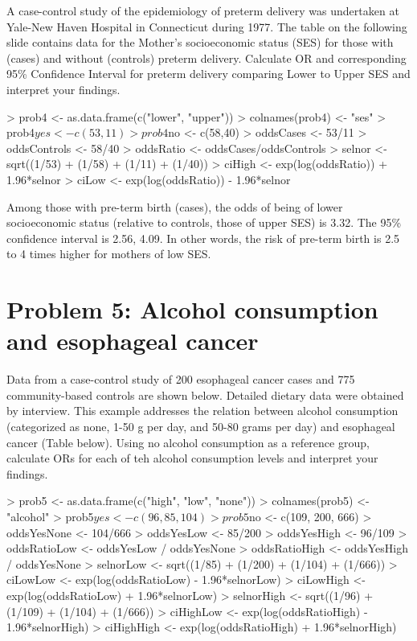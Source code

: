 \documentclass[12pt]{article}
\begin{document}
\textcolor{black!50}{A case-control study of the epidemiology of preterm delivery was undertaken at Yale-New Haven Hospital in Connecticut during 1977.  The table on the following slide contains data for the Mother's socioeconomic status (SES) for those with (cases) and without (controls) preterm delivery.  Calculate OR and corresponding 95\% Confidence Interval for preterm delivery comparing Lower to Upper SES and interpret your findings.  \\}
\begin{Schunk}
\begin{Sinput}
> prob4 <- as.data.frame(c("lower", "upper"))
> colnames(prob4) <- "ses"
> prob4$yes <- c(53,11)
> prob4$no <- c(58,40)
> oddsCases <- 53/11
> oddsControls <- 58/40
> oddsRatio <- oddsCases/oddsControls
> selnor <- sqrt((1/53) + (1/58) + (1/11) + (1/40))
> ciHigh <- exp(log(oddsRatio)) + 1.96*selnor
> ciLow <- exp(log(oddsRatio)) - 1.96*selnor
\end{Sinput}
\end{Schunk}

\noindent Among those with pre-term birth (cases), the odds of being of lower socioeconomic status (relative to controls, those of upper SES) is 3.32.  The 95\% confidence interval is 2.56, 4.09.  In other words, the risk of pre-term birth is 2.5 to 4 times higher for mothers of low SES.  

\newpage


\section*{Problem 5: Alcohol consumption and esophageal cancer}

\textcolor{black!50}{Data from a case-control study of 200 esophageal cancer cases and 775 community-based controls are shown below.  Detailed dietary data were obtained by interview.  This example addresses the relation between alcohol consumption (categorized as none, 1-50 g per day, and 50-80 grams per day) and esophageal cancer (Table below).  Using no alcohol consumption as a reference group, calculate ORs for each of teh alcohol consumption levels and interpret your findings.  \\}

\begin{Schunk}
\begin{Sinput}
> prob5 <- as.data.frame(c("high", "low", "none"))
> colnames(prob5) <- "alcohol"
> prob5$yes <- c(96, 85, 104)
> prob5$no <- c(109, 200, 666)
> oddsYesNone <- 104/666
> oddsYesLow <- 85/200
> oddsYesHigh <- 96/109
> oddsRatioLow <- oddsYesLow / oddsYesNone
> oddsRatioHigh <- oddsYesHigh / oddsYesNone
> selnorLow <- sqrt((1/85) + (1/200) + (1/104) + (1/666))
> ciLowLow <- exp(log(oddsRatioLow) - 1.96*selnorLow)
> ciLowHigh <- exp(log(oddsRatioLow) + 1.96*selnorLow)
> selnorHigh <- sqrt((1/96) + (1/109) + (1/104) + (1/666))
> ciHighLow <- exp(log(oddsRatioHigh) - 1.96*selnorHigh)
> ciHighHigh <- exp(log(oddsRatioHigh) + 1.96*selnorHigh)
\end{Sinput}
\end{Schunk}
\end{document}
